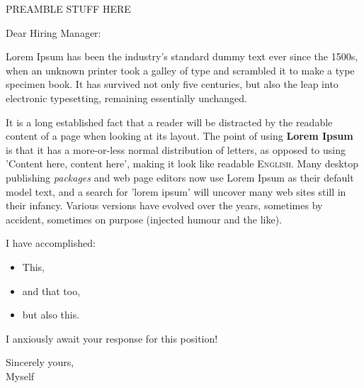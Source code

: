 PREAMBLE STUFF HERE

Dear Hiring Manager: \newline

Lorem Ipsum has been the industry's standard dummy text ever since the 1500s, when an unknown printer took a galley of type and scrambled it to make a type specimen book. 
It has survived not only five centuries, but also the leap into electronic typesetting, remaining essentially unchanged. 
 \newline

It is a long established fact that a reader will be distracted by the readable content of a page when looking at its layout. 
The point of using \textbf{Lorem Ipsum} is that it has a more-or-less normal distribution of letters, as opposed to using 'Content here, content here', making it look like readable \textsc{English}. 
Many desktop publishing \emph{packages} and web page editors now use Lorem Ipsum as their default model text, and a search for 'lorem ipsum' will uncover many web sites still in their infancy. 
Various versions have evolved over the years, sometimes by accident, sometimes on purpose (injected humour and the like). \newline

I have accomplished:
\begin{itemize}
\item This,
\item and that too,
\item but also this.
\end{itemize}  \vspace{\baselineskip} 

I anxiously await your response for this position! \newline

Sincerely yours, \\
Myself


